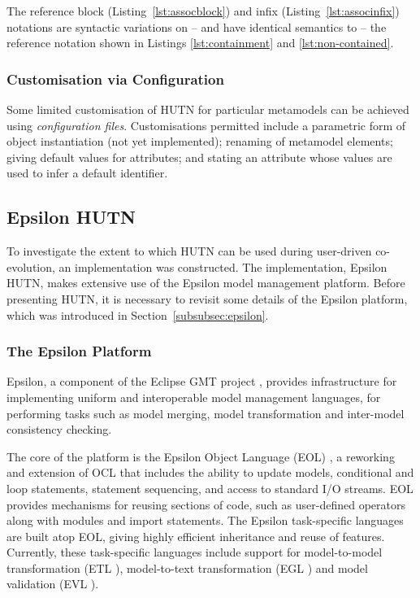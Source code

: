 The reference block (Listing~\ref{lst:assocblock}) and infix (Listing~\ref{lst:associnfix}) notations are syntactic variations on -- and have identical semantics to -- the reference notation shown in Listings \ref{lst:containment} and \ref{lst:non-contained}.


\subsubsection{Customisation via Configuration}
Some limited customisation of HUTN for particular metamodels can be achieved using \emph{configuration files}. Customisations permitted include a parametric form of object instantiation (not yet implemented); renaming of metamodel elements; giving default values for attributes; and stating an attribute whose values are used to infer a default identifier.


\subsection{Epsilon HUTN}
To investigate the extent to which HUTN can be used during user-driven co-evolution, an implementation was constructed. The implementation, Epsilon HUTN, makes extensive use of the Epsilon model management platform. Before presenting HUTN, it is necessary to revisit some details of the Epsilon \cite{kolovos09thesis} platform, which was introduced in Section~\ref{subsubsec:epsilon}.

\subsubsection{The Epsilon Platform}
Epsilon, a component of the Eclipse GMT project \cite{gmt}, provides infrastructure for implementing uniform and interoperable model management languages, for performing tasks such as model merging, model transformation and inter-model consistency checking. 

The core of the platform is the Epsilon Object Language (EOL) \cite{kolovos06eol}, a reworking and extension of OCL that includes the ability to update models, conditional and loop statements, statement sequencing, and access to standard I/O streams. EOL provides mechanisms for reusing sections of code, such as user-defined operators along with modules and import statements. The Epsilon task-specific languages are built atop EOL, giving highly efficient inheritance and reuse of features. Currently, these task-specific languages include support for model-to-model transformation (ETL \cite{kolovos08etl}), model-to-text transformation (EGL \cite{rose08egl}) and model validation (EVL \cite{kolovos08evl}).


